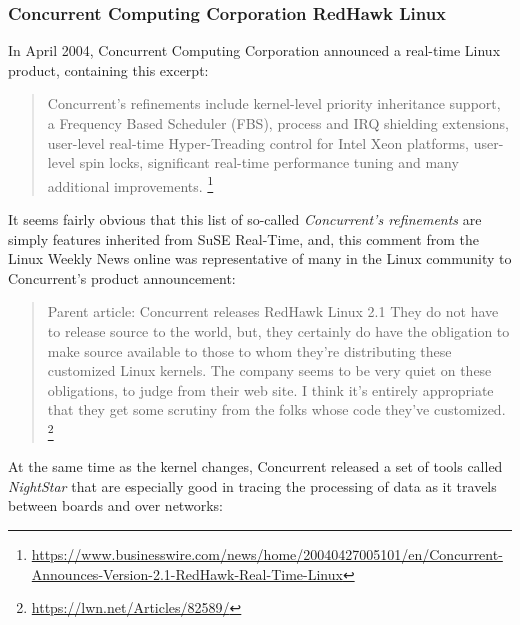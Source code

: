 \documentclass[12pt]{article}
\begin{document}
\subsubsection{Concurrent Computing Corporation RedHawk Linux}

In April 2004, Concurrent Computing Corporation announced a real-time
Linux product, containing this excerpt:

\begin{quote}
Concurrent's refinements include kernel-level priority inheritance support,
a Frequency Based Scheduler (FBS), process and IRQ shielding extensions,
user-level real-time Hyper-Treading control for Intel Xeon platforms,
user-level spin locks, significant real-time performance tuning and
many additional improvements.%
\footnote{\url{https://www.businesswire.com/news/home/20040427005101/en/Concurrent-Announces-Version-2.1-RedHawk-Real-Time-Linux}}
\end{quote}

It seems fairly obvious that this list of so-called \emph{Concurrent's refinements}
are simply features inherited from SuSE Real-Time, and, this comment from the Linux
Weekly News online was representative of many in the Linux community to
Concurrent's product announcement:

\begin{quote}
Parent article: Concurrent releases RedHawk Linux 2.1
They do not have to release source to the world, but,
they certainly do have the obligation to make source
available to those to whom they're distributing these
customized Linux kernels. The company seems to be very quiet on these
obligations, to judge from their web site. I think it's entirely
appropriate that they get some scrutiny from the folks
whose code they've customized.%
\footnote{\url{https://lwn.net/Articles/82589/}}
\end{quote}

At the same time as the kernel changes, Concurrent released a set of tools
called \emph{NightStar} that are especially good in tracing the processing of
data as it travels between boards and over networks:
\end{document}

